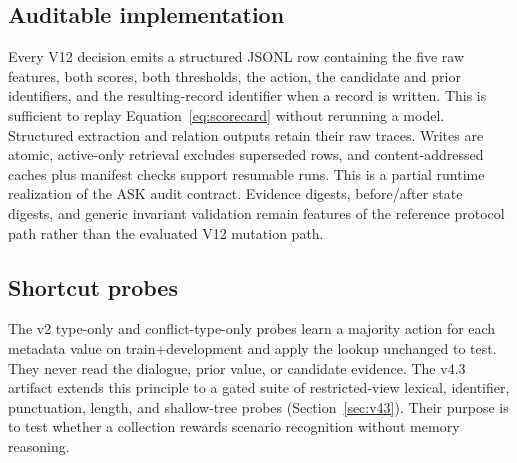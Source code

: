 \subsection{Auditable implementation}

Every V12 decision emits a structured JSONL row containing the five raw
features, both scores, both thresholds, the action, the candidate and prior
identifiers, and the resulting-record identifier when a record is written.
This is sufficient to replay Equation~\ref{eq:scorecard} without rerunning a
model. Structured extraction and relation outputs retain their raw traces.
Writes are atomic, active-only retrieval excludes superseded rows, and
content-addressed caches plus manifest checks support resumable runs. This is a
partial runtime realization of the ASK audit contract. Evidence digests,
before/after state digests, and generic invariant validation remain features of
the reference protocol path rather than the evaluated V12 mutation path.

\subsection{Shortcut probes}

The v2 type-only and conflict-type-only probes learn a majority action for each
metadata value on train+development and apply the lookup unchanged to test.
They never read the dialogue, prior value, or candidate evidence. The v4.3
artifact extends this principle to a gated suite of restricted-view lexical,
identifier, punctuation, length, and shallow-tree probes
(Section~\ref{sec:v43}). Their purpose is to test whether a collection rewards
scenario recognition without memory reasoning.
